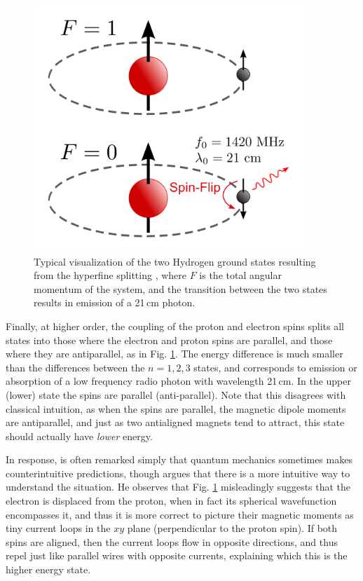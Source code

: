\begin{figure}
	\centering
	\includegraphics[width=4in]{chap0_intro/500px-Hydrogen-SpinFlip.svg.png}
	\caption[Diagram of the two Hydrogen ground states resulting from hyperfine splitting.]{Typical visualization of the two Hydrogen ground states resulting from the hyperfine splitting \citep{HydrogenSpinFlipGraphic}, where $F$ is the total angular momentum of the system, and the transition between the two states results in emission of a 21\,cm photon.}
	\label{fig:HydrogenSpinFlipGraphic}
\end{figure}

Finally, at higher order, the coupling of the proton and electron spins splits all states into those where the electron and proton spins are parallel, and those where they are antiparallel, as in Fig. \ref{fig:HydrogenSpinFlipGraphic}. The energy difference is much smaller than the differences between the $n=1,2,3$ states, and corresponds to emission or absorption of a low frequency radio photon with wavelength 21\,cm. In the upper (lower) state the spins are parallel (anti-parallel). Note that this disagrees with classical intuition, as when the spins are parallel, the magnetic dipole moments are antiparallel, and just as two antialigned magnets tend to attract, this state should actually have \textit{lower} energy. 

In response, is often remarked simply that quantum mechanics sometimes makes counterintuitive predictions, though \citet{griffiths82} argues that there is a more intuitive way to understand the situation. He observes that Fig. \ref{fig:HydrogenSpinFlipGraphic} misleadingly suggests that the electron is displaced from the proton, when in fact its spherical wavefunction encompasses it, and thus it is more correct to picture their magnetic moments as tiny current loops in the $xy$ plane (perpendicular to the proton spin). If both spins are aligned, then the current loops flow in opposite directions, and thus repel just like parallel wires with opposite currents, explaining which this is the higher energy state.

